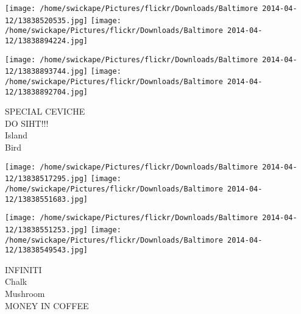 \documentclass[10pt,letterpaper]{article}
\begin{document}
\texttt{[image: /home/swickape/Pictures/flickr/Downloads/Baltimore 2014-04-12/13838520535.jpg]}
\texttt{[image: /home/swickape/Pictures/flickr/Downloads/Baltimore 2014-04-12/13838894224.jpg]}

\texttt{[image: /home/swickape/Pictures/flickr/Downloads/Baltimore 2014-04-12/13838893744.jpg]}
\texttt{[image: /home/swickape/Pictures/flickr/Downloads/Baltimore 2014-04-12/13838892704.jpg]}

SPECIAL CEVICHE\\
DO SIHT!!!\\
Island\\
Bird\\
\pagebreak

\texttt{[image: /home/swickape/Pictures/flickr/Downloads/Baltimore 2014-04-12/13838517295.jpg]}
\texttt{[image: /home/swickape/Pictures/flickr/Downloads/Baltimore 2014-04-12/13838551683.jpg]}

\texttt{[image: /home/swickape/Pictures/flickr/Downloads/Baltimore 2014-04-12/13838551253.jpg]}
\texttt{[image: /home/swickape/Pictures/flickr/Downloads/Baltimore 2014-04-12/13838549543.jpg]}

INFINITI\\
Chalk\\
Mushroom\\
MONEY IN COFFEE\\
\pagebreak
\end{document}
